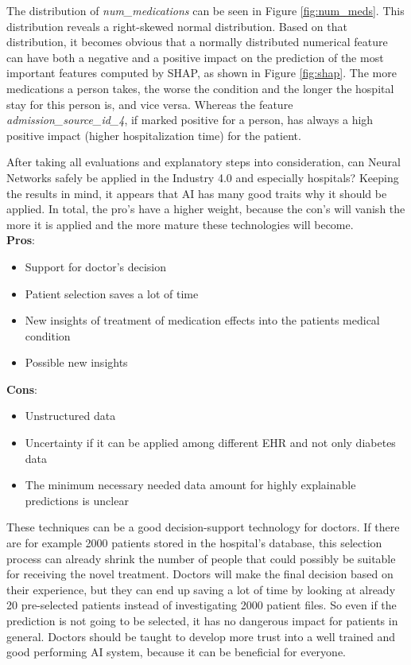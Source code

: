 \documentclass[journal]{IEEEtran}
\begin{document}
The distribution of \textit{num\_medications} can be seen in Figure \ref{fig:num_meds}. This distribution reveals a right-skewed normal distribution. Based on that distribution, it becomes obvious that a normally distributed numerical feature can have both a negative and a positive impact on the prediction of the most important features computed by SHAP, as shown in Figure \ref{fig:shap}. The more medications a person takes, the worse the condition and the longer the hospital stay for this person is, and vice versa. Whereas the feature \textit{admission\_source\_id\_4}, if marked positive for a person, has always a high positive impact (higher hospitalization time) for the patient.  

After taking all evaluations and explanatory steps into consideration, can Neural Networks safely be applied in the Industry 4.0 and especially hospitals? Keeping the results in mind, it appears that AI has many good traits why it should be applied. In total, the pro's have a higher weight, because the con's will vanish the more it is applied and the more mature these technologies will become. \\ 

\textbf{Pros}: 

\begin{itemize}
	\item Support for doctor's decision
	\item Patient selection saves a lot of time
	\item New insights of treatment of medication effects into the patients medical condition
	\item Possible new insights \\
\end{itemize}

\textbf{Cons}: 

\begin{itemize}
	\item Unstructured data
	\item Uncertainty if it can be applied among different EHR and not only diabetes data
	\item The minimum necessary needed data amount for highly explainable predictions is unclear \\
\end{itemize}

These techniques can be a good decision-support technology for doctors. If there are for example 2000 patients stored in the hospital's database, this selection process can already shrink the number of people that could possibly be suitable for receiving the novel treatment. Doctors will make the final decision based on their experience, but they can end up saving a lot of time by looking at already 20 pre-selected patients instead of investigating 2000 patient files. So even if the prediction is not going to be selected, it has no dangerous impact for patients in general. Doctors should be taught to develop more trust into a well trained and good performing AI system, because it can be beneficial for everyone.
\end{document}
